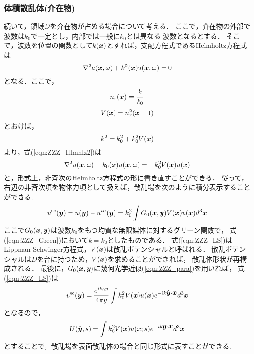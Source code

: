 \subsubsection{体積散乱体(介在物)}
続いて，領域$D$を介在物が占める場合について考える．
ここで，介在物の外部で波数は$k_0$で一定とし，内部では一般に$k_0$とは異なる
波数となるとする．
そこで，波数を位置の関数として$k(\mbox{\boldmath $x$})$とすれば，支配方程式であるHelmholtz方程式は
\begin{equation}
	\nabla^2 u(\mbox{\boldmath $x$},\omega) + k^2(\mbox{\boldmath $x$}) u(\mbox{\boldmath $x$},\omega) =0
	\label{eqn:ZZZ_Hlmhlz2}
\end{equation}
となる．ここで，
\begin{equation}
	n_r(\mbox{\boldmath $x$}) =\frac{k}{k_0}
	\label{eqn:ZZZ_13}
\end{equation}
\begin{equation}
	V(\mbox{\boldmath $x$})=n_r^2(\mbox{\boldmath $x$}-1)
	\label{eqn:ZZZ_14}
\end{equation}
とおけば，
\begin{equation}
	k^2=k_0^2 + k_0^2 V(\mbox{\boldmath $x$})
	\label{eqn:ZZZ_15}
\end{equation}
より，式(\ref{eqn:ZZZ_Hlmhlz2})は
\begin{equation}
	\nabla^2 u(\mbox{\boldmath $x$},\omega) + k_0(\mbox{\boldmath $x$}) u(\mbox{\boldmath $x$},\omega) = -k_0^2 V(\mbox{\boldmath $x$})u(\mbox{\boldmath $x$})
	\label{eqn:ZZZ_Hlmhlz3}
\end{equation}
と，形式上，非斉次のHelmholtz方程式の形に書き直すことができる．
従って，右辺の非斉次項を物体力項として扱えば，散乱場を次のように積分表示することができる．
\begin{equation}
	u^{\rm sc}(\mbox{\boldmath $y$})=u(\mbox{\boldmath $y$})-u^{in}(\mbox{\boldmath $y$}) = k_0^2\int G_0(\mbox{\boldmath $x$},\mbox{\boldmath $y$})V(\mbox{\boldmath $x$})u(\mbox{\boldmath $x$}) d^3\mbox{\boldmath $x$}
	\label{eqn:ZZZ_LS}
\end{equation}
ここで$G_0(\mbox{\boldmath $x$},\mbox{\boldmath $y$})$は波数$k_0$をもつ均質な無限媒体に対するグリーン関数で，
式(\ref{eqn:ZZZ_Green})において$k=k_0$としたものである．
式(\ref{eqn:ZZZ_LS})はLippman-Schwinger方程式，$V(\mbox{\boldmath $x$})$は散乱ポテンシャルと呼ばれる．
散乱ポテンシャルは$D$を台に持つため，$V(\mbox{\boldmath $x$})$を求めることができれば，
散乱体形状が再構成される．
最後に，$G_0(\mbox{\boldmath $x$},\mbox{\boldmath $y$})$に幾何光学近似(\ref{eqn:ZZZ_para})を用いれば，
式(\ref{eqn:ZZZ_LS})は
\begin{equation}
	u^{\rm sc}(\mbox{\boldmath $y$})
	=
	\frac{e^{ik_0y}}{4\pi y}
	\int
	k_0^2 V(\mbox{\boldmath $x$})u(\mbox{\boldmath $x$}) e^{-ik\hat{\mbox{\boldmath $y$}}\cdot \mbox{\boldmath $x$}}d^3\mbox{\boldmath $x$}
	\label{eqn:ZZZ_16}
\end{equation}
となるので，
\begin{equation}
	U(\hat{\mbox{\boldmath $y$}},s)
	=
	\int
	k_0^2 V(\mbox{\boldmath $x$})u(\mbox{\boldmath $x$};s) e^{-ik\hat{\mbox{\boldmath $y$}}\cdot \mbox{\boldmath $x$}}d^3\mbox{\boldmath $x$}
	\label{eqn:ZZZ_U_vol}
\end{equation}
とすることで，散乱場を表面散乱体の場合と同じ形式に表すことができる．
%
